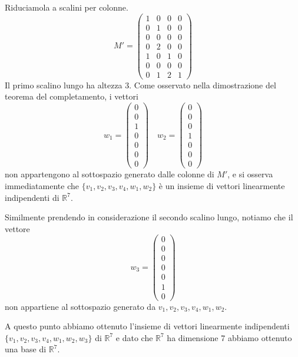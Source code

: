 \begin{example}
	Riduciamola a scalini per colonne.
	\begin{equation*}
		M' = \begin{pmatrix}
			1 & 0 & 0 & 0 \\
			0 & 1 & 0 & 0 \\
			0 & 0 & 0 & 0 \\
			0 & 2 & 0 & 0 \\
			1 & 0 & 1 & 0 \\
			0 & 0 & 0 & 0 \\
			0 & 1 & 2 & 1
		\end{pmatrix}
	\end{equation*}
	Il primo scalino lungo ha altezza 3. Come osservato nella dimostrazione
	del teorema del completamento, i vettori
	\begin{equation*}
		w_1 = \begin{pmatrix}
			0 \\ 0 \\ 1 \\ 0 \\ 0 \\ 0 \\ 0
		\end{pmatrix} \quad
		w_2 = \begin{pmatrix}
			0 \\ 0 \\ 0 \\ 1 \\ 0 \\ 0 \\ 0
		\end{pmatrix}
	\end{equation*}
	non appartengono al sottospazio generato dalle colonne di $M'$, e si
	osserva immediatamente che $\{v_1, v_2, v_3, v_4, w_1, w_2\}$ \`e un
	insieme di vettori linearmente indipendenti di $\mathbb{R}^7$.

	Similmente prendendo in considerazione il secondo scalino lungo, notiamo
	che il vettore
	\begin{equation*}
		w_3 = \begin{pmatrix}
			0 \\ 0 \\ 0 \\ 0 \\ 0 \\ 1 \\ 0
		\end{pmatrix}
	\end{equation*}
	non appartiene al sottospazio generato da $v_1, v_2, v_3, v_4, w_1, w_2$.

	A questo punto abbiamo ottenuto l'insieme di vettori linearmente indipendenti
	$\{v_1, v_2, v_3, v_4, w_1, w_2, w_3\}$ di $\mathbb{R}^7$ e dato che
	$\mathbb{R}^7$ ha dimensione 7 abbiamo ottenuto una base di $\mathbb{R}^7$.
\end{example}


